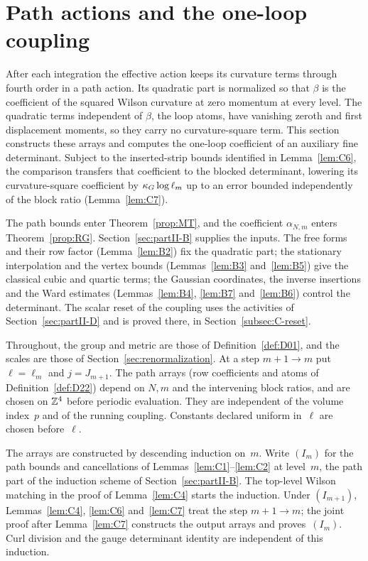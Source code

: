 \section{Path actions and the one-loop coupling}\label{sec:partII-C}

After each integration the effective action keeps its curvature terms through fourth order in a path action. Its quadratic part is normalized so that $\beta$ is the coefficient of the squared Wilson curvature at zero momentum at every level. The quadratic terms independent of $\beta$, the loop atoms, have vanishing zeroth and first displacement moments, so they carry no curvature-square term. This section constructs these arrays and computes the one-loop coefficient of an auxiliary fine determinant. Subject to the inserted-strip bounds identified in Lemma~\ref{lem:C6}, the comparison transfers that coefficient to the blocked determinant, lowering its curvature-square coefficient by $\kappa_G\log\ell_m$ up to an error bounded independently of the block ratio (Lemma~\ref{lem:C7}).

The path bounds enter Theorem~\ref{prop:MT}, and the coefficient $\alpha_{N,m}$ enters Theorem~\ref{prop:RG}. Section~\ref{sec:partII-B} supplies the inputs. The free forms and their row factor (Lemma~\ref{lem:B2}) fix the quadratic part; the stationary interpolation and the vertex bounds (Lemmas~\ref{lem:B3} and~\ref{lem:B5}) give the classical cubic and quartic terms; the Gaussian coordinates, the inverse insertions and the Ward estimates (Lemmas~\ref{lem:B4}, \ref{lem:B7} and~\ref{lem:B6}) control the determinant. The scalar reset of the coupling uses the activities of Section~\ref{sec:partII-D} and is proved there, in Section~\ref{subsec:C-reset}.

Throughout, the group and metric are those of Definition~\ref{def:D01}, and the scales are those of Section~\ref{sec:renormalization}. At a step $m+1\to m$ put $\ell=\ell_m$ and $j=J_{m+1}$. The path arrays (row coefficients and atoms of Definition~\ref{def:D22}) depend on $N,m$ and the intervening block ratios, and are chosen on $\mathbb{Z}^4$ before periodic evaluation. They are independent of the volume index~$p$ and of the running coupling. Constants declared uniform in~$\ell$ are chosen before~$\ell$.

The arrays are constructed by descending induction on~$m$. Write $(I_m)$ for the path bounds and cancellations of Lemmas~\ref{lem:C1}--\ref{lem:C2} at level~$m$, the path part of the induction scheme of Section~\ref{sec:partII-B}. The top-level Wilson matching in the proof of Lemma~\ref{lem:C4} starts the induction. Under $(I_{m+1})$, Lemmas~\ref{lem:C4}, \ref{lem:C6} and~\ref{lem:C7} treat the step $m+1\to m$; the joint proof after Lemma~\ref{lem:C7} constructs the output arrays and proves~$(I_m)$. Curl division and the gauge determinant identity are independent of this induction.

